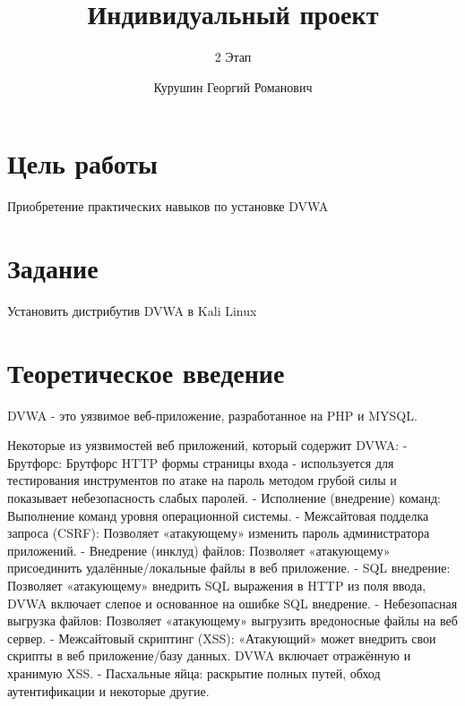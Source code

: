 \documentclass[
  english,
  russian,
  12pt,
  a4paper,
  DIV=11,
  numbers=noendperiod]{scrreprt}
\title{Индивидуальный проект}
\subtitle{2 Этап}
\author{Курушин Георгий Романович}
\date{}
\renewcommand*\contentsname{Содержание}
\newcommand\contentsname{Содержание}
\begin{document}
\maketitle

\renewcommand*\contentsname{Содержание}
{
\setcounter{tocdepth}{1}
\tableofcontents
}
\listoffigures
\listoftables

\chapter{Цель
работы}\label{ux446ux435ux43bux44c-ux440ux430ux431ux43eux442ux44b}

Приобретение практических навыков по установке DVWA

\chapter{Задание}\label{ux437ux430ux434ux430ux43dux438ux435}

Установить дистрибутив DVWA в Kali Linux

\chapter{Теоретическое
введение}\label{ux442ux435ux43eux440ux435ux442ux438ux447ux435ux441ux43aux43eux435-ux432ux432ux435ux434ux435ux43dux438ux435}

DVWA - это уязвимое веб-приложение, разработанное на PHP и MYSQL.

Некоторые из уязвимостей веб приложений, который содержит DVWA: -
Брутфорс: Брутфорс HTTP формы страницы входа - используется для
тестирования инструментов по атаке на пароль методом грубой силы и
показывает небезопасность слабых паролей. - Исполнение (внедрение)
команд: Выполнение команд уровня операционной системы. - Межсайтовая
подделка запроса (CSRF): Позволяет «атакующему» изменить пароль
администратора приложений. - Внедрение (инклуд) файлов: Позволяет
«атакующему» присоединить удалённые/локальные файлы в веб приложение. -
SQL внедрение: Позволяет «атакующему» внедрить SQL выражения в HTTP из
поля ввода, DVWA включает слепое и основанное на ошибке SQL внедрение. -
Небезопасная выгрузка файлов: Позволяет «атакующему» выгрузить
вредоносные файлы на веб сервер. - Межсайтовый скриптинг (XSS):
«Атакующий» может внедрить свои скрипты в веб приложение/базу данных.
DVWA включает отражённую и хранимую XSS. - Пасхальные яйца: раскрытие
полных путей, обход аутентификации и некоторые другие.
\end{document}
